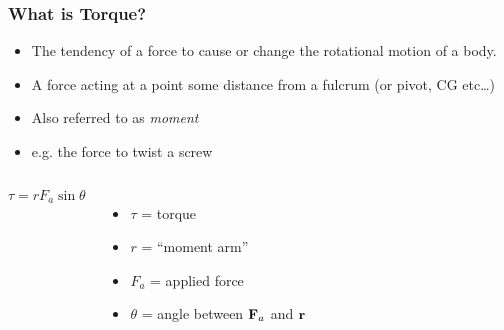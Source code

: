 \documentclass[12pt,compress,aspectratio=169]{beamer}
\newcommand{\mb}[1]{\ensuremath\mathbf{#1}}
\begin{document}
\begin{frame}
  \frametitle{What is Torque?}
  \begin{itemize}
  \item The tendency of a force to cause or change the rotational motion of a
    body.
  \item A force acting at a point some distance from a fulcrum (or pivot, CG
    etc\ldots)
  \item Also referred to as \emph{moment}
  \item e.g. the force to twist a screw
  \end{itemize}
  
  \begin{columns}

    \vspace{-0.5in}
    {\Huge
      \begin{displaymath}
        \boxed{\tau=rF_a\sin\theta}
      \end{displaymath}
    }

    \vspace{-0.3in}
    \begin{itemize}
    \item $\tau$ = torque
    \item $r$ = ``moment arm''
    \item $F_a$ = applied force
    \item $\theta$ = angle between $\mb{F}_a$ and $\mb{r}$
    \end{itemize}
    \begin{center}
    \end{center}
  \end{columns}
\end{frame}
\end{document}
